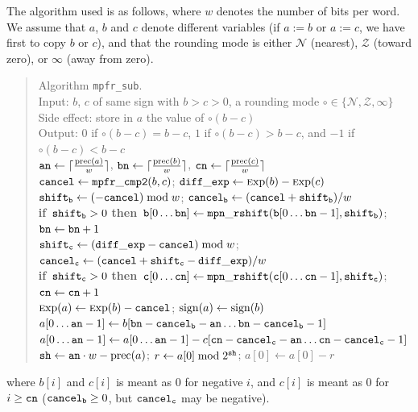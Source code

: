 \documentclass[12pt]{amsart}
\def\Exp{{\rm \textsc exp}}
\def\prec{{\rm prec}}
\def\sign{{\rm sign}}
\def\Z{{\mathcal Z}}
\def\N{{\mathcal N}}
\def\If{{\bf if}}
\def\then{{\bf then}}
\begin{document}
The algorithm used is as follows, where $w$ denotes the number of bits
per word. We assume that $a$, $b$ and $c$ denote different variables
(if $a:=b$ or $a:=c$, we have first to copy $b$ or $c$), and
that the rounding mode is either $\N$ (nearest),
$\Z$ (toward zero), or $\infty$ (away from zero).
\begin{quote}
Algorithm {\tt mpfr\_sub}. \\
Input: $b$, $c$ of same sign with $b > c > 0$, a rounding mode
$\circ \in \{ \N, \Z, \infty \}$ \\
Side effect: store in $a$ the value of $\circ(b - c)$ \\
Output: $0$ if $\circ(b - c) = b-c$, $1$ if $\circ(b - c) > b-c$,
        and $-1$ if $\circ(b - c) < b-c$ \\
${\tt an} \leftarrow \lceil \frac{\prec(a)}{w} \rceil$,
${\tt bn} \leftarrow \lceil \frac{\prec(b)}{w} \rceil$,
${\tt cn} \leftarrow \lceil \frac{\prec(c)}{w} \rceil$ \\
${\tt cancel} \leftarrow {\tt mpfr\_cmp2}(b, c)$; \quad
        ${\tt diff\_exp} \leftarrow \Exp(b)-\Exp(c)$ \\
${\tt shift_b} \leftarrow (-{\tt cancel}) \bmod w$; \quad
        ${\tt cancel_b} \leftarrow ({\tt cancel} + {\tt shift_b})/w$ \\
\If\ ${\tt shift_b} > 0$ \then\
        ${\tt b}[0 \dots \mbox{\tt bn}] \leftarrow
        {\tt mpn\_rshift}({\tt b}[0 \dots {\tt bn}-1], {\tt shift_b})$;
        ${\tt bn} \leftarrow {\tt bn} + 1$ \\
${\tt shift_c} \leftarrow ({\tt diff\_exp}-{\tt cancel}) \bmod w$; \quad
${\tt cancel_c} \leftarrow ({\tt cancel} + {\tt shift_c}-{\tt diff\_exp})/w$ \\
\If\ ${\tt shift_c} > 0$ \then\
        ${\tt c}[0 \dots \mbox{\tt cn}] \leftarrow
        {\tt mpn\_rshift}({\tt c}[0 \dots {\tt cn}-1], {\tt shift_c})$;
        ${\tt cn} \leftarrow {\tt cn} + 1$ \\
$\Exp(a) \leftarrow \Exp(b) - {\tt cancel}$; \quad
        $\sign(a) \leftarrow \sign(b)$ \\
$a[0 \dots {\tt an}-1] \leftarrow b[{\tt bn} - {\tt cancel_b} - {\tt an}
        \dots {\tt bn} - {\tt cancel_b} - 1]$ \\
$a[0 \dots {\tt an}-1] \leftarrow a[0 \dots {\tt an}-1] - c[{\tt cn} -
        {\tt cancel_c} - {\tt an} \dots {\tt cn} - {\tt cancel_c} - 1]$ \\
${\tt sh} \leftarrow {\tt an} \cdot w - \prec(a)$; \quad
        $r \leftarrow a[0] \bmod 2^{\tt sh}$; \quad
        $a[0] \leftarrow a[0] - r$ \\
\end{quote}
where $b[i]$ and $c[i]$ is meant as $0$ for negative $i$,
and $c[i]$ is meant as $0$ for $i \ge {\tt cn}$
(${\tt cancel_b} \ge 0$, but ${\tt cancel_c}$ may be negative).
\end{document}
